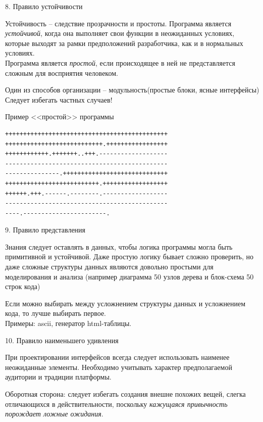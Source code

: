 \begin{frame}{8. Правило устойчивости}
	\begin{block}{Устойчивость -- следствие	прозрачности и простоты.}
		\pause
		Программа является {\itshape устойчивой},  когда она выполняет свои функции в неожиданных условиях,  которые выходят за рамки предположений разработчика,  как и в нормальных условиях.\\
		\pause
		Программа является {\itshape простой},  если происходящее в ней не представляется сложным для восприятия человеком.
	\end{block}
	\pause
	Один из способов организации -- модульность(простые блоки,  ясные интерфейсы)\\
	Следует избегать частных случаев!
\end{frame}

\begin{frame}[fragile]{Пример <<простой>> программы}
	\begin{center}
		\begin{verbatim}
+++++++++++++++++++++++++++++++++++++++++++++
+++++++++++++++++++++++++++.+++++++++++++++++
++++++++++++.+++++++..+++.-------------------
---------------------------------------------
---------------.+++++++++++++++++++++++++++++
++++++++++++++++++++++++++.++++++++++++++++++
++++++.+++.------.--------.------------------
---------------------------------------------
----.-----------------------.
		\end{verbatim}
	\end{center}
\end{frame}

\begin{frame}{9. Правило представления}
	\begin{block}{Знания следует оставлять в данных,  чтобы логика программы могла быть примитивной и устойчивой.}
		\pause
		Даже простую логику бывает сложно проверить,  но даже сложные структуры данных являются довольно простыми для моделирования и анализа (например диаграмма 50 узлов дерева и блок-схема 50 строк кода)
	\end{block}
	\pause
	Если можно выбирать между усложнением структуры данных и усложнением кода,  то лучше выбирать первое.\\
	Примеры: ascii,  генератор html-таблицы.
\end{frame}

\begin{frame}{10. Правило наименьшего удивления}
	\begin{block}{При проектировании интерфейсов всегда следует использовать наименее неожиданные элементы.}
		\pause
		Необходимо учитывать характер предполагаемой аудитории и традиции платформы.
	\end{block}
	\pause
	Оборотная сторона: следует избегать создания внешне похожих вещей,  слегка отличающихся в действительности,  поскольку {\itshape кажущаяся привычность порождает ложные ожидания}.
\end{frame}

